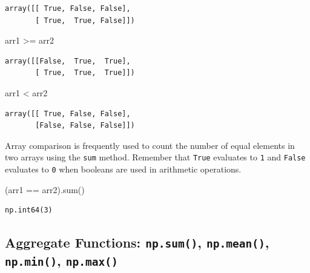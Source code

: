 \documentclass[
  letterpaper,
  DIV=11,
  numbers=noendperiod]{scrreprt}
\newenvironment{Shaded}{\begin{snugshade}}{\end{snugshade}}
\newcommand{\BuiltInTok}[1]{\textcolor[rgb]{0.00,0.23,0.31}{#1}}
\newcommand{\NormalTok}[1]{\textcolor[rgb]{0.00,0.23,0.31}{#1}}
\newcommand{\OperatorTok}[1]{\textcolor[rgb]{0.37,0.37,0.37}{#1}}
\begin{document}
\begin{verbatim}
array([[ True, False, False],
       [ True,  True, False]])
\end{verbatim}

\begin{Shaded}
\begin{Highlighting}[]
\NormalTok{arr1 }\OperatorTok{\textgreater{}=}\NormalTok{ arr2}
\end{Highlighting}
\end{Shaded}

\begin{verbatim}
array([[False,  True,  True],
       [ True,  True,  True]])
\end{verbatim}

\begin{Shaded}
\begin{Highlighting}[]
\NormalTok{arr1 }\OperatorTok{\textless{}}\NormalTok{ arr2}
\end{Highlighting}
\end{Shaded}

\begin{verbatim}
array([[ True, False, False],
       [False, False, False]])
\end{verbatim}

Array comparison is frequently used to count the number of equal
elements in two arrays using the \texttt{sum} method. Remember that
\texttt{True} evaluates to \texttt{1} and \texttt{False} evaluates to
\texttt{0} when booleans are used in arithmetic operations.

\begin{Shaded}
\begin{Highlighting}[]
\NormalTok{(arr1 }\OperatorTok{==}\NormalTok{ arr2).}\BuiltInTok{sum}\NormalTok{()}
\end{Highlighting}
\end{Shaded}

\begin{verbatim}
np.int64(3)
\end{verbatim}

\hypertarget{aggregate-functions-np.sum-np.mean-np.min-np.max}{%
\subsection{\texorpdfstring{Aggregate Functions: \texttt{np.sum()},
\texttt{np.mean()}, \texttt{np.min()},
\texttt{np.max()}}{Aggregate Functions: np.sum(), np.mean(), np.min(), np.max()}}\label{aggregate-functions-np.sum-np.mean-np.min-np.max}}
\end{document}

